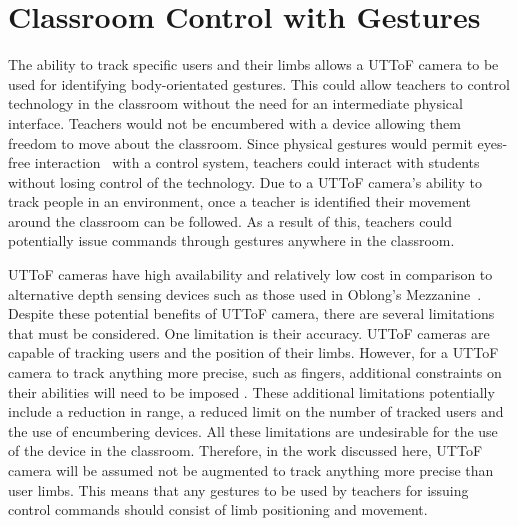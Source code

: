 \documentclass[manuscript, review, screen]{acmart}
\begin{document}

\section{Classroom Control with Gestures}  
\label{sec:classcontrol}

The ability to track specific users and their limbs allows a \ac{UTToF} camera to be used for identifying body-orientated gestures.
This could allow teachers to control technology in the classroom without the need for an intermediate physical interface.
Teachers would not be encumbered with a device allowing them freedom to move about the classroom.
Since physical gestures would permit eyes-free interaction~\citep{Brewster2003} with a control system, teachers could interact with students without losing control of the technology.
Due to a \ac{UTToF} camera's ability to track people in an environment, once a teacher is identified their movement around the classroom can be followed.
As a result of this, teachers could potentially issue commands through gestures anywhere in the classroom.

\ac{UTToF} cameras have high availability and relatively low cost in comparison to alternative depth sensing devices such as those used in Oblong's Mezzanine~\citep{kramer2011}.
Despite these potential benefits of \ac{UTToF} camera, there are several limitations that must be considered.
One limitation is their accuracy.
\ac{UTToF} cameras are capable of tracking users and the position of their limbs.
However, for a \ac{UTToF} camera to track anything more precise, such as fingers, additional constraints on their abilities will need to be imposed \citep{Clark2011}.
These additional limitations potentially include a reduction in range, a reduced limit on the number of tracked users and the use of encumbering devices.
All these limitations are undesirable for the use of the device in the classroom.
Therefore, in the work discussed here, \ac{UTToF} camera will be assumed not be augmented to track anything more precise than user limbs.
This means that any gestures to be used by teachers for issuing control commands should consist of limb positioning and movement.
\end{document}
